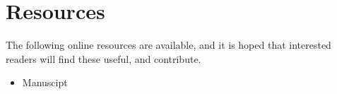 \section{Resources}

The following online resources are available, and it is hoped that interested readers will find these useful, and contribute.

\begin{itemize}
\item Manuscipt
\end{itemize}